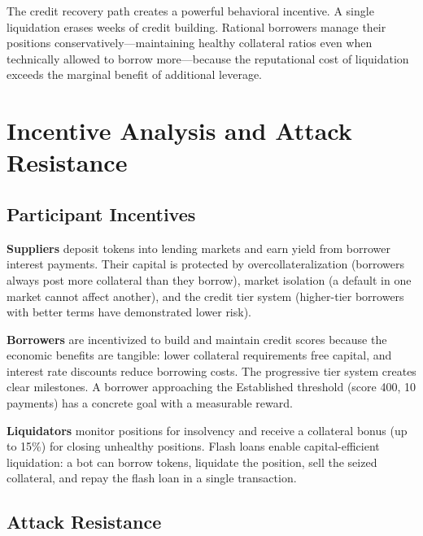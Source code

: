 \documentclass[11pt,a4paper]{article}
\begin{document}
\begin{keyinsight}
The credit recovery path creates a powerful behavioral incentive. A single liquidation erases weeks of credit building. Rational borrowers manage their positions conservatively---maintaining healthy collateral ratios even when technically allowed to borrow more---because the reputational cost of liquidation exceeds the marginal benefit of additional leverage.
\end{keyinsight}

\section{Incentive Analysis and Attack Resistance}

\subsection{Participant Incentives}

\textbf{Suppliers} deposit tokens into lending markets and earn yield from borrower interest payments. Their capital is protected by overcollateralization (borrowers always post more collateral than they borrow), market isolation (a default in one market cannot affect another), and the credit tier system (higher-tier borrowers with better terms have demonstrated lower risk).

\textbf{Borrowers} are incentivized to build and maintain credit scores because the economic benefits are tangible: lower collateral requirements free capital, and interest rate discounts reduce borrowing costs. The progressive tier system creates clear milestones. A borrower approaching the Established threshold (score 400, 10 payments) has a concrete goal with a measurable reward.

\textbf{Liquidators} monitor positions for insolvency and receive a collateral bonus (up to 15\%) for closing unhealthy positions. Flash loans enable capital-efficient liquidation: a bot can borrow tokens, liquidate the position, sell the seized collateral, and repay the flash loan in a single transaction.

\subsection{Attack Resistance}
\end{document}
